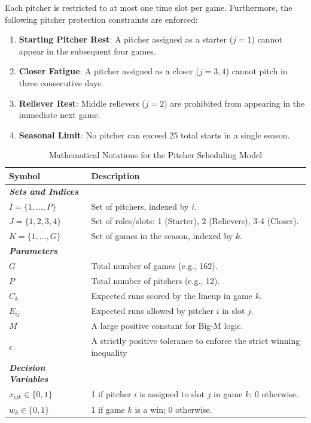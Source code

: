 \documentclass[11pt, a4paper]{article}
\begin{document}
Each pitcher is restricted to at most one time slot per game.
Furthermore, the following pitcher protection constraints are enforced:
\begin{enumerate}
    \item \textbf{Starting Pitcher Rest}: A pitcher assigned as a starter ($j=1$) cannot appear in the subsequent four games.
    \item \textbf{Closer Fatigue}: A pitcher assigned as a closer ($j=3, 4$) cannot pitch in three consecutive days.
    \item \textbf{Reliever Rest}: Middle relievers ($j=2$) are prohibited from appearing in the immediate next game.
    \item \textbf{Seasonal Limit}: No pitcher can exceed 25 total starts in a single season.
\end{enumerate}

\begin{table}[h]
\centering
\caption{Mathematical Notations for the Pitcher Scheduling Model}
\begin{tabular}{ll}
\hline
\textbf{Symbol} & \textbf{Description} \\ \hline
\textit{\textbf{Sets and Indices}} & \\
$I = \{1, \dots, P\}$ & Set of pitchers, indexed by $i$. \\
$J = \{1, 2, 3, 4\}$ & Set of roles/slots: 1 (Starter), 2 (Relievers), 3-4 (Closer). \\
$K = \{1, \dots, G\}$ & Set of games in the season, indexed by $k$. \\ \hline
\textit{\textbf{Parameters}} & \\
$G$ & Total number of games (e.g., 162). \\
$P$ & Total number of pitchers (e.g., 12). \\
$C_k$ & Expected runs scored by the lineup in game $k$. \\
$E_{ij}$ & Expected runs allowed by pitcher $i$ in slot $j$. \\
$M$ & A large positive constant for Big-M logic. \\
$\epsilon$ & A strictly positive tolerance to enforce the strict winning inequality \\ \hline
\textit{\textbf{Decision Variables}} & \\
$x_{ijk} \in \{0, 1\}$ & 1 if pitcher $i$ is assigned to slot $j$ in game $k$; 0 otherwise. \\
$w_k \in \{0, 1\}$ & 1 if game $k$ is a win; 0 otherwise. \\ \hline
\end{tabular}
\end{table}
\end{document}
